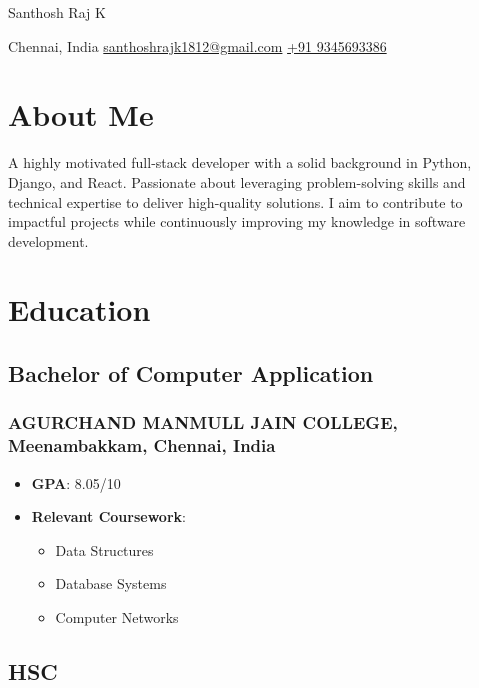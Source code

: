 \documentclass[11pt]{article}
\begin{document}
\begin{center}      
    {\fontsize{30}{30}\selectfont Santhosh Raj K} \\ \bigskip

    {\color{icnclr}\faMapMarker} Chennai, India \quad 
    {\color{icnclr}\faEnvelope[regular]} \href{mailto:santhoshrajk1812@gmail.com}{santhoshrajk1812@gmail.com} \quad
    {\color{icnclr}\Mobilefone} \href{tel:+91 9345693386}{+91 9345693386} 
\end{center}

\section{About Me}
A highly motivated full-stack developer with a solid background in Python, Django, and React. Passionate about leveraging problem-solving skills and technical expertise to deliver high-quality solutions. I aim to contribute to impactful projects while continuously improving my knowledge in software development.

\section{Education}
\subsection{Bachelor of Computer Application \hfill {}}  
\subsubsection{AGURCHAND MANMULL JAIN COLLEGE, Meenambakkam, Chennai, India}
\begin{itemize}
    \item \textbf{GPA}: 8.05/10
    \item \textbf{Relevant Coursework}: 
    \begin{itemize}
        \item Data Structures
        \item Database Systems
        \item Computer Networks
    \end{itemize}
\end{itemize}

\subsection{HSC \hfill {}}  
\end{document}
